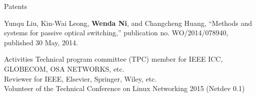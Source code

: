 \documentclass{resume} %
\begin{document}
\begin{rSection}{Patents}

Yunqu Liu, Kin-Wai Leong, \textbf{Wenda Ni}, and Changcheng Huang, ``Methods and systems for passive optical switching,'' publication no. WO/2014/078940, published 30 May, 2014.

\end{rSection}



\begin{rSection}{Activities}
Technical program committee (TPC) member for IEEE ICC, GLOBECOM, OSA NETWORKS, etc. \\
Reviewer for IEEE, Elsevier, Springer, Wiley, etc. \\
Volunteer of the Technical Conference on Linux Networking 2015 (Netdev 0.1)
\end{rSection}


\end{document}
